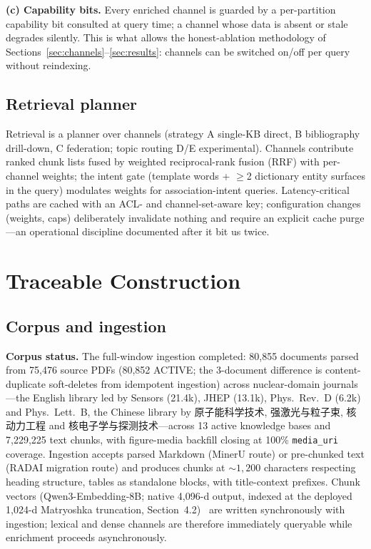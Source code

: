 \documentclass[sigconf,nonacm]{acmart}
\begin{document}
\textbf{(c) Capability bits.} Every enriched channel is guarded by a
per-partition capability bit consulted at query time; a channel whose data is
absent or stale degrades silently. This is what allows the honest-ablation
methodology of Sections~\ref{sec:channels}--\ref{sec:results}: channels can
be switched on/off per query without reindexing.

\subsection{Retrieval planner}

Retrieval is a planner over channels (strategy A single-KB direct, B
bibliography drill-down, C federation; topic routing D/E experimental).
Channels contribute ranked chunk lists fused by weighted reciprocal-rank
fusion (RRF) with per-channel weights; the intent gate (template words +
$\geq$2 dictionary entity surfaces in the query) modulates weights for
association-intent queries. Latency-critical paths are cached with an ACL- and
channel-set-aware key; configuration changes (weights, caps) deliberately
invalidate nothing and require an explicit cache purge---an operational
discipline documented after it bit us twice.

\section{Traceable Construction}
\label{sec:construction}

\subsection{Corpus and ingestion}

\textbf{Corpus status.} The full-window ingestion completed: 80{,}855
documents parsed from 75{,}476 source PDFs (80{,}852 ACTIVE; the 3-document
difference is content-duplicate soft-deletes from idempotent ingestion) across
nuclear-domain journals---the English library led by Sensors (21.4k), JHEP
(13.1k), Phys.\ Rev.\ D (6.2k) and Phys.\ Lett.\ B, the Chinese library by
原子能科学技术, 强激光与粒子束, 核动力工程 and 核电子学与探测技术---across
13 active knowledge bases and 7{,}229{,}225 text chunks, with figure-media
backfill closing at 100\% \texttt{media\_uri} coverage. Ingestion accepts
parsed Markdown (MinerU route) or pre-chunked text (RADAI migration route)
and produces chunks at ${\sim}1{,}200$ characters respecting heading
structure, tables as standalone blocks, with title-context prefixes. Chunk
vectors (Qwen3-Embedding-8B; native 4{,}096-d output, indexed at the
deployed 1{,}024-d Matryoshka truncation, Section~4.2)~\cite{qwen3emb} are
written synchronously with ingestion; lexical and dense channels are therefore
immediately queryable while enrichment proceeds asynchronously.
\end{document}
